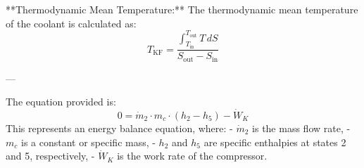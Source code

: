 **Thermodynamic Mean Temperature:**  
The thermodynamic mean temperature of the coolant is calculated as:  
\[
T_{\text{KF}} = \frac{\int_{T_{\text{in}}}^{T_{\text{out}}} T \, dS}{S_{\text{out}} - S_{\text{in}}}
\]  

---

The equation provided is:  
\[
0 = \dot{m}_2 \cdot m_c \cdot (h_2 - h_5) - \dot{W}_K
\]  
This represents an energy balance equation, where:  
- \(\dot{m}_2\) is the mass flow rate,  
- \(m_c\) is a constant or specific mass,  
- \(h_2\) and \(h_5\) are specific enthalpies at states 2 and 5, respectively,  
- \(\dot{W}_K\) is the work rate of the compressor.
